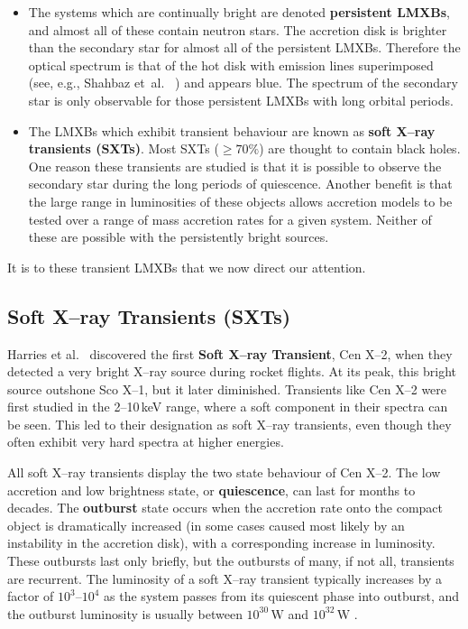 \begin{itemize}
\item %
The systems which are continually bright are denoted
\textbf{persistent LMXBs}, and almost all of these contain neutron stars. %
The accretion disk is brighter than the secondary star for almost all of the persistent
LMXBs. Therefore the optical spectrum is that of the hot disk with emission lines superimposed (see, e.g., Shahbaz et~al.\ %
%
) and appears blue. The spectrum of the secondary star is only
observable for those persistent LMXBs with long orbital periods. %

\item %
The LMXBs which exhibit transient behaviour are known as \textbf{soft
X--ray transients (SXTs)}. Most SXTs ($\geq 70\%$) are thought to contain black holes.
One reason these transients are studied is that it is possible to observe the secondary star during the long periods of quiescence. Another benefit is that the large range in
luminosities of these objects allows accretion models to be tested
over a range of mass accretion rates for a given system. Neither of these are possible with the persistently bright sources. %


\end{itemize}
It is to these transient LMXBs that we now direct our attention. %



\subsection{Soft X--ray Transients (SXTs)}\label{cha:Introduction:sec:X--rayBinaries:subsec:SXTs}

Harries et al.\ %
\citeyear{Harries_et_al.:1967} %
discovered the first \textbf{Soft X--ray Transient}, %
Cen X--2, when they detected a very bright X--ray source %
during rocket flights. %
At its peak, this bright source outshone Sco X--1, but it later
diminished. Transients like Cen X--2 were first studied in the 2--10\,keV range, where a
soft component in their spectra can be seen. This led to their
designation as soft X--ray transients, even though they often exhibit
very hard spectra at higher energies. %

\vspace{\myparskip}

All soft X--ray transients display the two state behaviour of Cen X--2. The low
accretion and low brightness state, or
\textbf{quiescence}, can last for months to decades. The \textbf{outburst}
state occurs when the accretion rate onto the
compact object is dramatically increased (in some cases caused most
likely by an instability in the accretion disk), with a corresponding increase in luminosity.
These outbursts last only briefly, but the outbursts of many, if not all, transients are recurrent.
 The luminosity of a soft X--ray transient typically increases by a factor
of $10^3$--$10^4$ as the system passes from its quiescent phase into
outburst, and the outburst luminosity is usually between
$10^{30}\,\mathrm{W}$ and $10^{32}\,\mathrm{W}$ %
\cite{TanakaLewin:1995}. %

